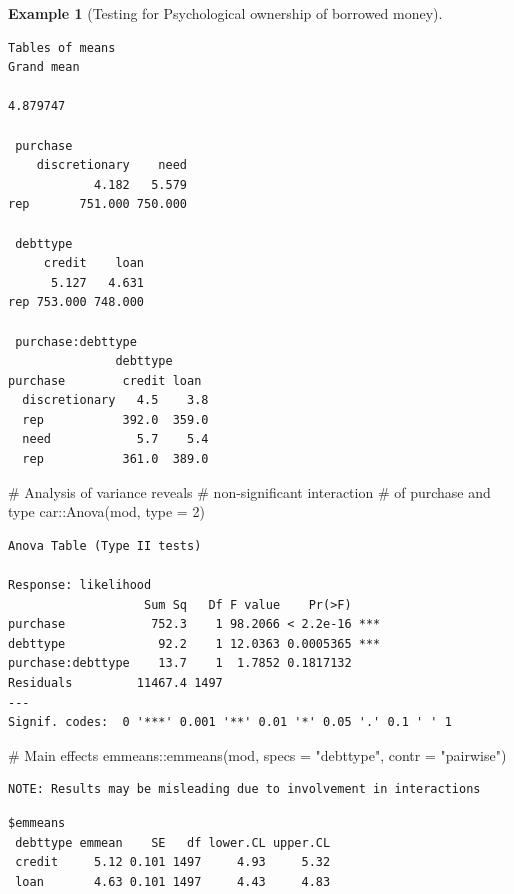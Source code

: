 \documentclass[
  11pt,
  letterpaper,
]{scrbook}
\newenvironment{Shaded}{\begin{snugshade}}{\end{snugshade}}
\newcommand{\AttributeTok}[1]{\textcolor[rgb]{0.40,0.45,0.13}{#1}}
\newcommand{\CommentTok}[1]{\textcolor[rgb]{0.37,0.37,0.37}{#1}}
\newcommand{\DecValTok}[1]{\textcolor[rgb]{0.68,0.00,0.00}{#1}}
\newcommand{\FunctionTok}[1]{\textcolor[rgb]{0.28,0.35,0.67}{#1}}
\newcommand{\NormalTok}[1]{\textcolor[rgb]{0.00,0.23,0.31}{#1}}
\newcommand{\SpecialCharTok}[1]{\textcolor[rgb]{0.37,0.37,0.37}{#1}}
\newcommand{\StringTok}[1]{\textcolor[rgb]{0.13,0.47,0.30}{#1}}
\theoremstyle{definition}
\theoremstyle{definition}
\newtheorem{example}{Example}[chapter]
\theoremstyle{remark}
\begin{document}
\begin{example}[Testing for Psychological ownership of borrowed
money]
\begin{verbatim}
Tables of means
Grand mean
         
4.879747 

 purchase 
    discretionary    need
            4.182   5.579
rep       751.000 750.000

 debttype 
     credit    loan
      5.127   4.631
rep 753.000 748.000

 purchase:debttype 
               debttype
purchase        credit loan 
  discretionary   4.5    3.8
  rep           392.0  359.0
  need            5.7    5.4
  rep           361.0  389.0
\end{verbatim}

\begin{Shaded}
\begin{Highlighting}[]
\CommentTok{\# Analysis of variance reveals }
\CommentTok{\# non{-}significant interaction}
\CommentTok{\# of purchase and type}
\NormalTok{car}\SpecialCharTok{::}\FunctionTok{Anova}\NormalTok{(mod, }\AttributeTok{type =} \DecValTok{2}\NormalTok{)}
\end{Highlighting}
\end{Shaded}

\begin{verbatim}
Anova Table (Type II tests)

Response: likelihood
                   Sum Sq   Df F value    Pr(>F)    
purchase            752.3    1 98.2066 < 2.2e-16 ***
debttype             92.2    1 12.0363 0.0005365 ***
purchase:debttype    13.7    1  1.7852 0.1817132    
Residuals         11467.4 1497                      
---
Signif. codes:  0 '***' 0.001 '**' 0.01 '*' 0.05 '.' 0.1 ' ' 1
\end{verbatim}

\begin{Shaded}
\begin{Highlighting}[]
\CommentTok{\# Main effects}
\NormalTok{emmeans}\SpecialCharTok{::}\FunctionTok{emmeans}\NormalTok{(mod, }
                 \AttributeTok{specs =} \StringTok{"debttype"}\NormalTok{,}
                 \AttributeTok{contr =} \StringTok{"pairwise"}\NormalTok{)}
\end{Highlighting}
\end{Shaded}

\begin{verbatim}
NOTE: Results may be misleading due to involvement in interactions
\end{verbatim}

\begin{verbatim}
$emmeans
 debttype emmean    SE   df lower.CL upper.CL
 credit     5.12 0.101 1497     4.93     5.32
 loan       4.63 0.101 1497     4.43     4.83


\end{verbatim}
\end{example}
\end{document}
